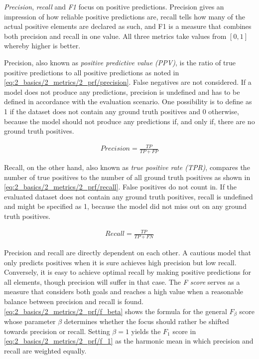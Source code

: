 \emph{Precision}, \emph{recall} and \emph{F1} focus on positive predictions. Precision gives an impression of how reliable positive predictions are, recall tells how many of the actual positive elements are declared as such, and F1 is a measure that combines both precision and recall in one value. All three metrics take values from $[0, 1]$ whereby higher is better.

Precision, also known as \emph{positive predictive value (PPV)}, is the ratio of true positive predictions to all positive predictions as noted in \autoref{eq:2_basics/2_metrics/2_prf/precision}. False negatives are not considered. If a model does not produce any predictions, precision is undefined and has to be defined in accordance with the evaluation scenario. One possibility is to define as 1 if the dataset does not contain any ground truth positives and 0 otherwise, because the model should not produce any predictions if, and only if, there are no ground truth positives.

\begin{align}
    Precision = \frac{TP}{TP + FP}
    \label{eq:2_basics/2_metrics/2_prf/precision}
\end{align}

Recall, on the other hand, also known as \emph{true positive rate (TPR)}, compares the number of true positives to the number of all ground truth positives as shown in \autoref{eq:2_basics/2_metrics/2_prf/recall}. False positives do not count in. If the evaluated dataset does not contain any ground truth positives, recall is undefined and might be specified as 1, because the model did not miss out on any ground truth positives.

\begin{align}
    Recall = \frac{TP}{TP + FN}
    \label{eq:2_basics/2_metrics/2_prf/recall}
\end{align}

Precision and recall are directly dependent on each other. A cautious model that only predicts positives when it is sure achieves high precision but low recall. Conversely, it is easy to achieve optimal recall by making positive predictions for all elements, though precision will suffer in that case. The \emph{F score} serves as a measure that considers both goals and reaches a high value when a reasonable balance between precision and recall is found. \autoref{eq:2_basics/2_metrics/2_prf/f_beta} shows the formula for the general $F_\beta$ score whose parameter $\beta$ determines whether the focus should rather be shifted towards precision or recall. Setting $\beta = 1$ yields the $F_1$ score in \autoref{eq:2_basics/2_metrics/2_prf/f_1} as the harmonic mean in which precision and recall are weighted equally.

